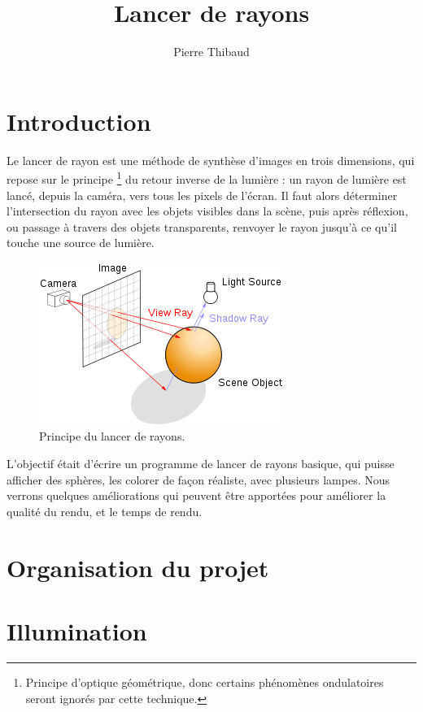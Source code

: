 \documentclass[10pt,a4paper]{article}
\author{Pierre \bsc{Donat-Bouillud} Thibaud \bsc{Ehret}}
\title{Lancer de rayons}
\begin{document}
\maketitle

\section*{Introduction} %
Le lancer de rayon est une méthode de synthèse d'images en trois dimensions, qui repose sur le principe \footnote{Principe d'optique géométrique, donc certains phénomènes
ondulatoires seront ignorés par cette technique.} du retour inverse de la lumière : un rayon de lumière est lancé, depuis la caméra, vers tous les pixels de l'écran. 
Il faut alors déterminer l'intersection du rayon avec les objets visibles dans la scène, puis après réflexion, ou passage à travers des objets transparents, renvoyer le rayon jusqu'à ce qu'il touche une source de lumière.
\begin{figure}[!h]
\begin{center}
\includegraphics[scale=0.5]{../presentation/raytracing.png}
\end{center}
\caption{Principe du lancer de rayons.}
\end{figure}
L'objectif était d'écrire un programme de lancer de rayons basique, qui puisse afficher des sphères, les colorer de façon réaliste, avec plusieurs lampes.
Nous verrons quelques améliorations qui peuvent être apportées pour améliorer la qualité du rendu, et le temps de rendu.

\section{Organisation du projet} %



\section{Illumination} %

\end{document}
